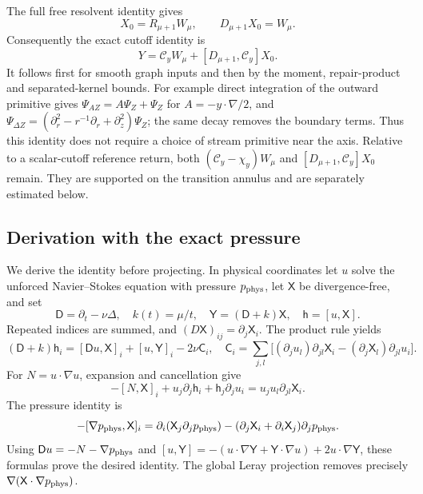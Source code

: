 The full free resolvent identity gives
\begin{equation}\label{ward:shifted-resolvent}
 X_0=R_{\mu+1}W_\mu,\qquad D_{\mu+1}X_0=W_\mu.
\end{equation}
Consequently the exact cutoff identity is
\begin{equation}\label{ward:cutoff-source}
 Y=\mathcal C_yW_\mu+[D_{\mu+1},\mathcal C_y]X_0.
\end{equation}
It follows first for smooth graph inputs and then by the moment,
repair-product and separated-kernel bounds. For example direct
integration of the outward primitive gives
$\Psi_{AZ}=A\Psi_Z+\Psi_Z$ for $A=-y\cdot\nabla/2$, and
$\Psi_{\Delta Z}=(\partial_r^2-r^{-1}\partial_r+\partial_z^2)\Psi_Z$;
the same decay removes the boundary terms. Thus this identity does
not require a choice of stream primitive near the axis.
Relative to a scalar-cutoff reference return, both
$(\mathcal C_y-\chi_y)W_\mu$ and
$[D_{\mu+1},\mathcal C_y]X_0$ remain. They are supported on the
transition annulus and are separately estimated below.

\subsection{Derivation with the exact pressure}

We derive the identity before projecting. In physical coordinates let
$u$ solve the unforced Navier--Stokes equation with pressure $p_{\rm phys}$,
let $\mathsf X$ be divergence-free, and set
\[
 \mathsf D=\partial_t-\nu\Delta,\quad k(t)=\mu/t,
 \quad \mathsf Y=(\mathsf D+k)\mathsf X,
 \quad \mathsf h=[u,\mathsf X].
\]
Repeated indices are summed, and $(D\mathsf X)_{ij}=\partial_j\mathsf X_i$.
The product rule yields
\[
 (\mathsf D+k)\mathsf h_i
 =[\mathsf Du,\mathsf X]_i+[u,\mathsf Y]_i-2\nu\mathsf C_i,
 \quad
 \mathsf C_i=\sum_{j,l}
 \bigl[(\partial_ju_l)\partial_{jl}\mathsf X_i
       -(\partial_j\mathsf X_l)\partial_{jl}u_i\bigr].
\]
For $N=u\cdot\nabla u$, expansion and cancellation give
\[
 -[N,\mathsf X]_i+u_j\partial_j\mathsf h_i
             +\mathsf h_j\partial_ju_i
       =u_ju_l\partial_{jl}\mathsf X_i.
\]
The pressure identity is
\[
 -[\nabla p_{\rm phys},\mathsf X]_i
 =\partial_i(\mathsf X_j\partial_jp_{\rm phys})
  -(\partial_j\mathsf X_i+\partial_i\mathsf X_j)
                                      \partial_jp_{\rm phys}.
\]
Using $\mathsf Du=-N-\nabla p_{\rm phys}$ and
$[u,\mathsf Y]=-(u\cdot\nabla\mathsf Y+
\mathsf Y\cdot\nabla u)+2u\cdot\nabla\mathsf Y$, these formulas
prove the desired identity. The global Leray projection removes
precisely $\nabla(\mathsf X\cdot\nabla p_{\rm phys})$.

